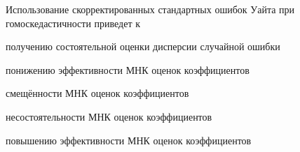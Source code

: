 
\begin{question}
Использование скорректированных стандартных ошибок Уайта при гомоскедастичности приведет к
\begin{answerlist}
  \item получению состоятельной оценки дисперсии случайной ошибки
  \item понижению эффективности МНК оценок коэффициентов
  \item смещённости МНК оценок коэффициентов
  \item несостоятельности МНК оценок коэффициентов
  \item повышению эффективности МНК оценок коэффициентов
\end{answerlist}
\end{question}


